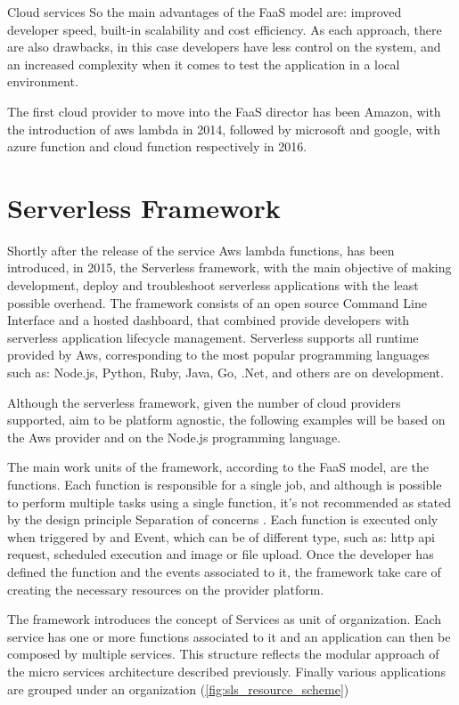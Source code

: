 \begin{chapter}{Cloud services}
    So the main advantages of the FaaS model are: improved developer speed, built-in
    scalability and cost efficiency. As each approach, there are also drawbacks, in
    this case developers have less control on the system, and an increased complexity when it
    comes to test the application in a local environment.

    The first cloud provider to move into the FaaS director has been Amazon, with the
    introduction of aws lambda in 2014, followed by microsoft and google, with
    azure function and cloud function respectively in 2016.

    \section{Serverless Framework}
    \label{sec:serverless_framework}
    Shortly after the release of the service Aws lambda functions, has been introduced,
    in 2015, the Serverless framework, with the main objective of making development,
    deploy and troubleshoot serverless applications with the least possible overhead.
    The framework consists of an open source Command Line Interface and a hosted
    dashboard, that combined provide developers with serverless application lifecycle
    management. Serverless supports all runtime provided by Aws, corresponding to
    the most popular programming languages such as: Node.js, Python, Ruby, Java,
    Go, .Net, and others are on development.

    Although the serverless framework, given the number of cloud providers supported,
    aim to be platform agnostic, the following examples will be based on the Aws
    provider and on the Node.js programming language.

    The main work units of the framework, according to the FaaS model, are the functions.
    Each function is responsible for a single job, and although is possible to perform
    multiple tasks using a single function, it's not recommended as stated by the
    design principle Separation of concerns \cite{separation_of_concerns}.
    Each function is executed only when triggered by and Event, which can be of different
    type, such as: http api request, scheduled execution and image or file upload.
    Once the developer has defined the function and the events associated to it,
    the framework take care of creating the necessary resources on the provider platform.

    The framework introduces the concept of Services as unit of organization. Each
    service has one or more functions associated to it and an application can then
    be composed by multiple services. This structure reflects the modular approach
    of the micro services architecture described previously. Finally various applications
    are grouped under an organization (\ref{fig:sls_resource_scheme})


\end{chapter}
